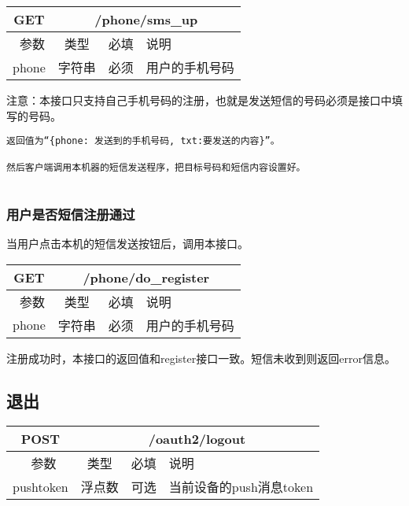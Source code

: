 \begin{table}[H]
   \begin{center}
\begin{tabular}{|c|c|c|p{12cm}|}
\hline
GET & \multicolumn{3}{|c|}{/phone/sms\_up} \\
\hline\hline
 \  参数  & 类型 & 必填 &  说明  \\
\hline
 phone  & 字符串 & 必须 &  用户的手机号码\\
\hline
\end{tabular}
   \end{center}
\end{table}
注意：本接口只支持自己手机号码的注册，也就是发送短信的号码必须是接口中填写的号码。


\begin{verbatim}
返回值为“{phone: 发送到的手机号码, txt:要发送的内容}”。

然后客户端调用本机器的短信发送程序，把目标号码和短信内容设置好。


\end{verbatim}


\subsubsection{用户是否短信注册通过}
当用户点击本机的短信发送按钮后，调用本接口。

\begin{table}[H]
   \begin{center}
\begin{tabular}{|c|c|c|p{12cm}|}
\hline
GET & \multicolumn{3}{|c|}{/phone/do\_register} \\
\hline\hline
 \  参数  & 类型 & 必填 &  说明  \\
\hline
 phone  & 字符串 & 必须 &  用户的手机号码\\
\hline
\end{tabular}
   \end{center}
\end{table}

注册成功时，本接口的返回值和register接口一致。短信未收到则返回error信息。



\subsection{退出}

\begin{table}[H]
   \begin{center}
\begin{tabular}{|c|c|c|p{12cm}|}
\hline
POST & \multicolumn{3}{|c|}{/oauth2/logout} \\
\hline\hline
 \  参数  & 类型 & 必填 &  说明  \\
\hline
    pushtoken  & 浮点数 & 可选 &  当前设备的push消息token\\
\hline
\end{tabular}
   \end{center}
\end{table}

